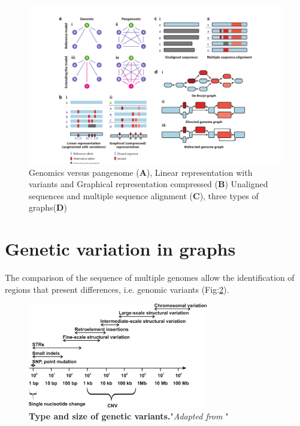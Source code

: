 \begin{figure}[H]
\centering
\includegraphics[width=1.00\textwidth]{fig/pangenome_genome.png}
\decoRule
\caption{Genomics versus pangenome (\textbf{A}), Linear representation with variants and Graphical representation compressed (\textbf{B})  Unaligned sequences and multiple sequence alignment (\textbf{C}), three types of graphs(\textbf{D}) \cite{eizenga2020pangenome}}
\label{fig:genomevspangenome.png}
\end{figure}


\section{Genetic variation in graphs}
The comparison of the sequence of multiple  genomes allow the identification of regions that present differences, i.e. genomic variants (Fig:\ref{fig:typeOfVariants}).  


\begin{figure}[H]
\centering
\includegraphics[width=0.7\textwidth]{fig/typeOfVariants.jpeg}
\decoRule
\caption{\textbf{Type and size of genetic variants.}"\textit{Adapted from} \cite{pollex2007copy}"} 
\label{fig:typeOfVariants}
\end{figure}

